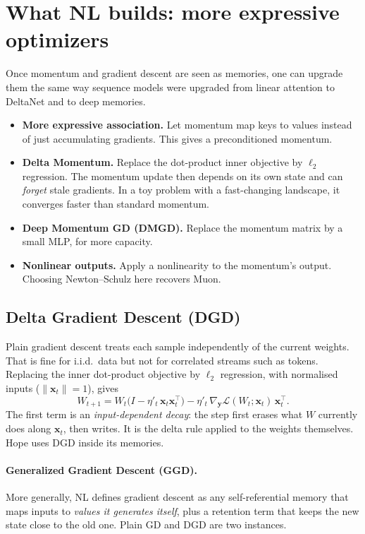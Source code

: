 \documentclass[11pt,a4paper]{article}
\newcommand{\Lc}{\mathcal{L}}
\newcommand{\bx}{\mathbf{x}}
\newcommand{\by}{\mathbf{y}}
\begin{document}
\section{What NL builds: more expressive optimizers}

Once momentum and gradient descent are seen as memories, one can upgrade them the same way sequence models were upgraded from linear attention to DeltaNet and to deep memories.

\begin{itemize}
  \item \textbf{More expressive association.} Let momentum map keys to values instead of just accumulating gradients. This gives a preconditioned momentum.
  \item \textbf{Delta Momentum.} Replace the dot-product inner objective by $\ell_2$ regression. The momentum update then depends on its own state and can \emph{forget} stale gradients. In a toy problem with a fast-changing landscape, it converges faster than standard momentum.
  \item \textbf{Deep Momentum GD (DMGD).} Replace the momentum matrix by a small MLP, for more capacity.
  \item \textbf{Nonlinear outputs.} Apply a nonlinearity to the momentum's output. Choosing Newton--Schulz here recovers Muon.
\end{itemize}

\subsection{Delta Gradient Descent (DGD)}\label{sec:dgd}
Plain gradient descent treats each sample independently of the current weights. That is fine for i.i.d.\ data but not for correlated streams such as tokens. Replacing the inner dot-product objective by $\ell_2$ regression, with normalised inputs ($\|\bx_t\|=1$), gives
\begin{equation}
  W_{t+1} = W_t\big(I - \eta'_t\,\bx_t\bx_t^{\top}\big) - \eta'_t\,\nabla_{\by}\Lc(W_t;\bx_t)\,\bx_t^{\top}.
\end{equation}
The first term is an \emph{input-dependent decay}: the step first erases what $W$ currently does along $\bx_t$, then writes. It is the delta rule applied to the weights themselves. Hope uses DGD inside its memories.

\paragraph{Generalized Gradient Descent (GGD).} More generally, NL defines gradient descent as any self-referential memory that maps inputs to \emph{values it generates itself}, plus a retention term that keeps the new state close to the old one. Plain GD and DGD are two instances.
\end{document}
